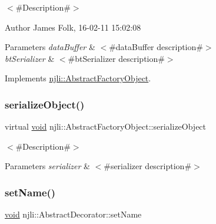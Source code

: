 $<$\#\+Description\#$>$ 

\begin{DoxyAuthor}{Author}
James Folk, 16-\/02-\/11 15\+:02\+:08
\end{DoxyAuthor}

\begin{DoxyParams}{Parameters}
{\em data\+Buffer} & $<$\#data\+Buffer description\#$>$ \\
\hline
{\em bt\+Serializer} & $<$\#bt\+Serializer description\#$>$ \\
\hline
\end{DoxyParams}


Implements \mbox{\hyperlink{classnjli_1_1_abstract_factory_object_aad2fbe86fb3bdecf02918a96b9c57976}{njli\+::\+Abstract\+Factory\+Object}}.

\mbox{\label{classnjli_1_1_physics_field_a4fc4bcd9d1930911474210c047372fc0}} 
\subsubsection{\texorpdfstring{serialize\+Object()}{serializeObject()}}
{\footnotesize\ttfamily virtual \mbox{\hyperlink{_thread_8h_af1e856da2e658414cb2456cb6f7ebc66}{void}} njli\+::\+Abstract\+Factory\+Object\+::serialize\+Object}

$<$\#\+Description\#$>$


\begin{DoxyParams}{Parameters}
{\em serializer} & $<$\#serializer description\#$>$ \\
\hline
\end{DoxyParams}
\mbox{\label{classnjli_1_1_physics_field_a087eb5f8d9f51cc476f12f1d10a3cb95}} 
\subsubsection{\texorpdfstring{set\+Name()}{setName()}}
{\footnotesize\ttfamily \mbox{\hyperlink{_thread_8h_af1e856da2e658414cb2456cb6f7ebc66}{void}} njli\+::\+Abstract\+Decorator\+::set\+Name}

